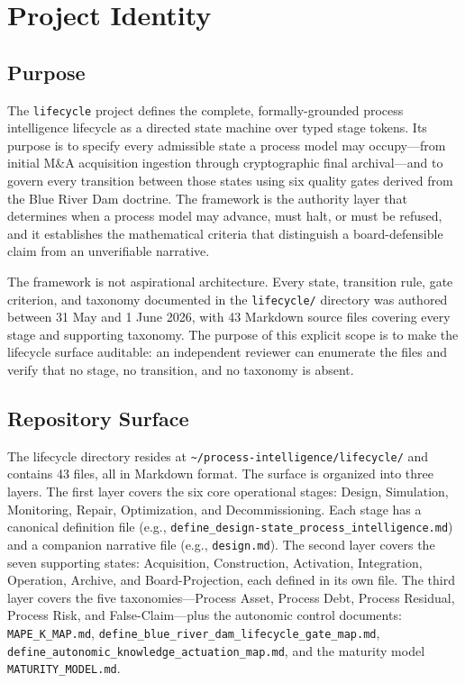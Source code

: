 
\section{Project Identity}
\label{sec:lifecycle-identity}

\subsection{Purpose}
\label{sec:lifecycle-identity-purpose}

The \texttt{lifecycle} project defines the complete, formally-grounded process intelligence
lifecycle as a directed state machine over typed stage tokens. Its purpose is to specify
every admissible state a process model may occupy---from initial M\&A acquisition ingestion
through cryptographic final archival---and to govern every transition between those states
using six quality gates derived from the Blue River Dam doctrine. The framework is the
authority layer that determines when a process model may advance, must halt, or must be
refused, and it establishes the mathematical criteria that distinguish a board-defensible
claim from an unverifiable narrative.

The framework is not aspirational architecture. Every state, transition rule, gate criterion,
and taxonomy documented in the \texttt{lifecycle/} directory was authored between 31 May and
1 June 2026, with 43 Markdown source files covering every stage and supporting taxonomy. The
purpose of this explicit scope is to make the lifecycle surface auditable: an independent
reviewer can enumerate the files and verify that no stage, no transition, and no taxonomy
is absent.

\subsection{Repository Surface}
\label{sec:lifecycle-identity-surface}

The lifecycle directory resides at \texttt{\textasciitilde/process-intelligence/lifecycle/}
and contains 43 files, all in Markdown format. The surface is organized into three layers.
The first layer covers the six core operational stages: Design, Simulation, Monitoring,
Repair, Optimization, and Decommissioning. Each stage has a canonical definition file
(e.g., \texttt{define\_design-state\_process\_intelligence.md}) and a companion narrative
file (e.g., \texttt{design.md}). The second layer covers the seven supporting states:
Acquisition, Construction, Activation, Integration, Operation, Archive, and Board-Projection,
each defined in its own file. The third layer covers the five taxonomies---Process Asset,
Process Debt, Process Residual, Process Risk, and False-Claim---plus the autonomic control
documents: \texttt{MAPE\_K\_MAP.md}, \texttt{define\_blue\_river\_dam\_lifecycle\_gate\_map.md},
\texttt{define\_autonomic\_knowledge\_actuation\_map.md}, and the maturity model
\texttt{MATURITY\_MODEL.md}.

